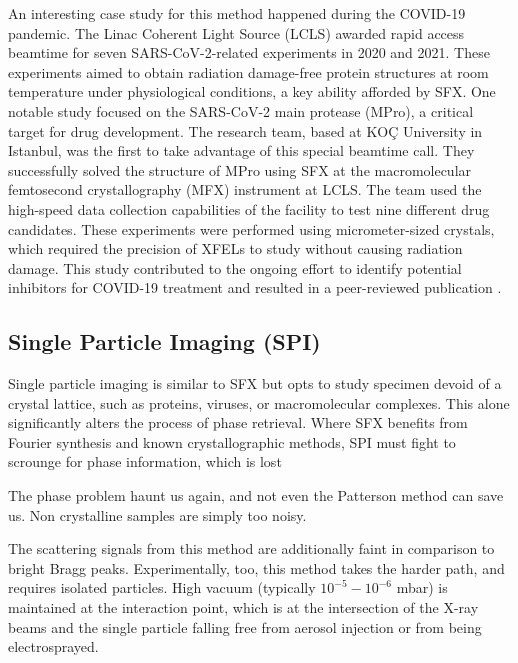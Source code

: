 \documentclass[aps,prb,twocolumn,superscriptaddress]{revtex4-2}
\begin{document}
An interesting case study for this method happened during the COVID-19
pandemic. The Linac Coherent Light Source (LCLS) awarded rapid access beamtime
for seven SARS-CoV-2-related experiments in 2020 and 2021. These experiments
aimed to obtain radiation damage-free protein structures at room temperature
under physiological conditions, a key ability afforded by SFX. One
notable study focused on the SARS-CoV-2 main protease (MPro), a critical target
for drug development. The research team, based at KOÇ University in Istanbul,
was the first to take advantage of this special beamtime call. They
successfully solved the structure of MPro using SFX at the macromolecular
femtosecond crystallography (MFX) instrument at LCLS. The team used the
high-speed data collection capabilities of the facility to
test nine different drug candidates. These experiments were performed using
micrometer-sized crystals, which required the precision of XFELs to study
without causing radiation damage. This study contributed to the ongoing effort
to identify potential inhibitors for COVID-19 treatment and resulted in a
peer-reviewed publication \cite{Botha2023}.





\subsection{Single Particle Imaging (SPI)}
Single particle imaging is similar to SFX but opts to study specimen devoid of
a crystal lattice, such as proteins, viruses, or macromolecular complexes. This
alone significantly alters the process of phase retrieval. 
Where SFX benefits from Fourier synthesis and known crystallographic
methods, SPI must fight to scrounge for phase information, which is lost

The phase problem haunt us again, and not even the Patterson method can save us.
Non crystalline samples are simply too noisy.

The scattering signals from this method are additionally faint in comparison to
bright Bragg peaks. Experimentally, too, this method takes the harder path, 
and requires isolated particles. High vacuum (typically $10^{-5}-10^{-6}$ mbar)
is maintained at the interaction point, which is at the intersection of the 
X-ray beams and the single particle falling free from aerosol injection or 
from being electrosprayed.
\end{document}
